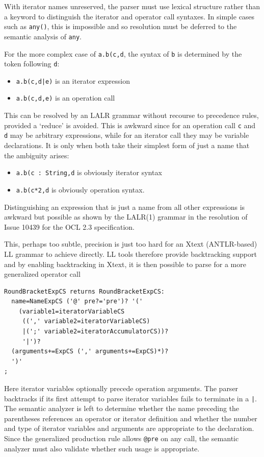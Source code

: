 \documentclass[runningheads,a4paper]{llncs}
\begin{document}
With iterator names unreserved, the parser must use lexical structure rather than a keyword to distinguish the iterator and operator call syntaxes. In simple cases such as \verb+any()+, this is impossible and so resolution must be deferred to the semantic analysis of \verb+any+.

For the more complex case of \verb+a.b(c,d+, the syntax of \verb+b+ is determined by the token following \verb+d+:
\begin{itemize}
\item \verb+a.b(c,d|e)+ is an iterator expression
\item\verb+a.b(c,d,e)+ is an operation call
\end{itemize}
This can be resolved by an LALR grammar without recourse to precedence rules, provided a `reduce' is avoided. This is awkward since for an operation call \verb+c+ and \verb+d+ may be arbitrary expressions, while for an iterator call they may be variable declarations. It is only when both take their simplest form of just a name that the ambiguity arises:
\begin{itemize}
\item \verb+a.b(c : String,d+ is obviously iterator syntax
\item \verb+a.b(c*2,d+ is obviously operation syntax.
\end{itemize}
Distinguishing an expression that is just a name from all other expressions is awkward but possible as shown by the LALR(1) grammar in the resolution of Issue 10439\cite{OCL2.3} for the OCL 2.3 specification.

This, perhaps too subtle, precision is just too hard for an Xtext (ANTLR-based) LL grammar to achieve directly. LL tools therefore provide backtracking support and by enabling backtracking in Xtext, it is then possible to parse for a more generalized operator call

{\small\begin{verbatim}
RoundBracketExpCS returns RoundBracketExpCS:
  name=NameExpCS ('@' pre?='pre')? '('
    (variable1=iteratorVariableCS
     ((',' variable2=iteratorVariableCS)
     |(';' variable2=iteratorAccumulatorCS))?
     '|')?
  (arguments+=ExpCS (',' arguments+=ExpCS)*)?
  ')'
;
\end{verbatim}}

Here iterator variables optionally precede operation arguments. The parser backtracks if its first attempt to parse iterator variables fails to terminate in a \verb+|+. The semantic analyzer is left to determine whether the name preceding the parentheses references an operator or iterator definition and whether the number and type of iterator variables and arguments are appropriate to the declaration. Since the generalized production rule allows \verb+@pre+ on any call, the semantic analyzer must also validate whether such usage is appropriate.
\end{document}

